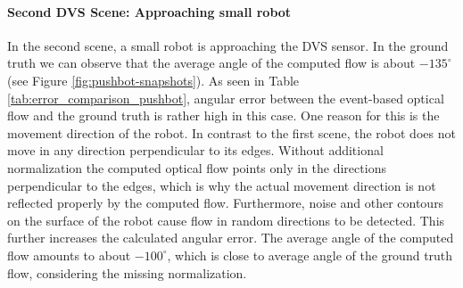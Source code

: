 \paragraph{Second DVS Scene: Approaching small robot}

In the second scene, a small robot is approaching the DVS sensor.
In the ground truth we can observe that the average angle of the computed flow is about $-135^\circ$ (see Figure \ref{fig:pushbot-snapshots}). 
As seen in Table \ref{tab:error_comparison_pushbot}, angular error between the event-based optical flow and the ground truth is rather high in this case.
One reason for this is the movement direction of the robot.
In contrast to the first scene, the robot does not move in any direction perpendicular to its edges.
Without additional normalization the computed optical flow points only in the directions perpendicular to the edges, which is why the actual movement direction is not reflected properly by the computed flow.
Furthermore, noise and other contours on the surface of the robot cause flow in random directions to be detected.
This further increases the calculated angular error.
The average angle of the computed flow amounts to about $-100^\circ$, which is close to average angle of the ground truth flow, considering the missing normalization.


